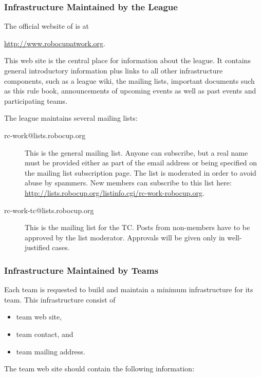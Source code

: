 \subsubsection{Infrastructure Maintained by the League}
The official website of \RCAW is at
\begin{center}
\url{http://www.robocupatwork.org}.	
\end{center}

This web site is the central place for information about the league. It contains general introductory information plus links to all other infrastructure components, such as a league wiki, the mailing lists, important documents such as this rule book, announcements of upcoming events as well as past events and participating teams.
\par
The league maintains several mailing lists:
\begin{description}
	\item[rc-work@lists.robocup.org] This is the general \RCAW mailing list. Anyone can subscribe, but a real name must be provided either as part of the email address or being specified on the mailing list subscription page. The list is moderated in order to avoid abuse by spammers. New members can subscribe to this list here: \url{http://lists.robocup.org/listinfo.cgi/rc-work-robocup.org}.

	\item[rc-work-tc@lists.robocup.org] This is the mailing list for the TC. Posts from non-members have to be approved by the list moderator. Approvals will be given only in well-justified cases.
\end{description}

\subsubsection{Infrastructure Maintained by Teams}
Each team is requested to build and maintain a minimum infrastructure for its team. This infrastructure consist of 

\begin{itemize}
	\item team web site,
	\item team contact, and
	\item team mailing address.
\end{itemize}

The team web site should contain the following information:

